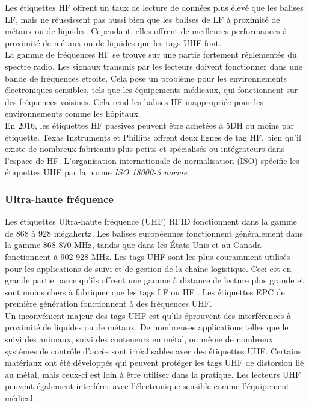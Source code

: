 \documentclass[11pt, a4paper, twoside]{book}
\begin{document}
Les étiquettes HF offrent un taux de lecture de données plus élevé que les balises LF, mais ne réussissent pas aussi bien que les balises de LF à proximité de métaux ou de liquides. Cependant, elles offrent de meilleures performances à proximité de métaux ou de liquides que les tags UHF font.\\

La gamme de fréquences HF se trouve sur une partie fortement réglementée du spectre radio. Les signaux transmis par les lecteurs doivent fonctionner dans une bande de fréquences étroite. Cela pose un problème pour les environnements électroniques sensibles, tels que les équipements médicaux, qui fonctionnent sur des fréquences voisines. Cela rend les balises HF inappropriée pour les environnements comme les hôpitaux.\\

En 2016, les étiquettes HF passives peuvent être achetées à 5DH ou moins par étiquette. Texas Instruments et Phillips offrent deux lignes de tag HF, bien qu'il existe de nombreux fabricants plus petits et spécialisés ou intégrateurs dans l'espace de HF.
L'organisation internationale de normalisation (ISO) spécifie les étiquettes UHF par la norme \emph{ISO 18000-3 norme} \cite{iso}.\\
\subsubsection{Ultra-haute fréquence}
Les étiquettes Ultra-haute fréquence (UHF) RFID fonctionnent dans la gamme de 868 à 928 mégahertz. Les balises européennes fonctionnent généralement dans la gamme 868-870 MHz, tandis que dans les États-Unis et au Canada fonctionnent à 902-928 MHz. Les tags UHF sont les plus couramment utilisés pour les applications de suivi et de gestion de la chaîne logistique. Ceci est en grande partie parce qu'ils offrent une gamme à distance de lecture plus grande et sont moins chers à fabriquer que les tags LF ou HF . Les étiquettes EPC de première génération fonctionnent à des fréquences UHF.\\

Un inconvénient majeur des tags UHF est qu'ils éprouvent des interférences à proximité de liquides ou de métaux. De nombreuses applications telles que le suivi des animaux, suivi des conteneurs en métal, ou même de nombreux systèmes de contrôle d'accès sont irréalisables avec des étiquettes UHF. Certains matériaux ont été développés qui peuvent protéger les tags UHF de distorsion lié au métal, mais ceux-ci est loin à être utiliser dans la pratique. Les lecteurs UHF peuvent également interférer avec l'électronique sensible comme l'équipement médical.\\
\end{document}
